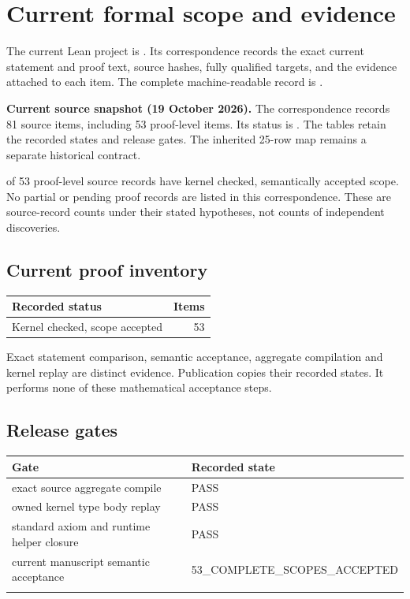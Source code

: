 \section{Current formal scope and evidence}\label{sec:current-release}

The current Lean project is . Its correspondence records the exact current statement and proof text, source hashes, fully qualified targets, and the evidence attached to each item. The complete machine-readable record is .

\textbf{Current source snapshot (19 October 2026).} The correspondence records 81 source items, including 53 proof-level items. Its status is . The tables retain the recorded states and release gates. The inherited 25-row map remains a separate historical contract.
\par{} of 53 proof-level source records have kernel checked, semantically accepted scope. No partial or pending proof records are listed in this correspondence. These are source-record counts under their stated hypotheses, not counts of independent discoveries.


\subsection{Current proof inventory}

\begin{tabular}{p{}r}\toprule Recorded status & Items \\ \midrule

Kernel checked, scope accepted & 53 \\

\bottomrule\end{tabular}

Exact statement comparison, semantic acceptance, aggregate compilation and kernel replay are distinct evidence. Publication copies their recorded states. It performs none of these mathematical acceptance steps.

\subsection{Release gates}

\begin{longtable}{p{}p{}}\toprule Gate & Recorded state \\ \midrule\endhead

exact source aggregate compile & PASS \\ \addlinespace

owned kernel type body replay & PASS \\ \addlinespace

standard axiom and runtime helper closure & PASS \\ \addlinespace

current manuscript semantic acceptance & 53\_COMPLETE\_SCOPES\_ACCEPTED \\ \addlinespace

\bottomrule\end{longtable}


